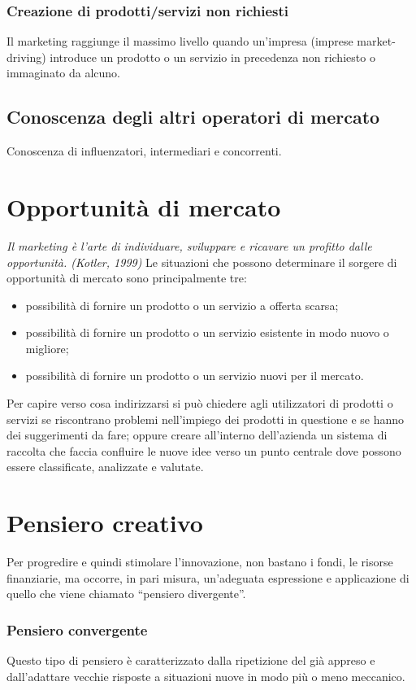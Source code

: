 \subsubsection*{Creazione di prodotti/servizi non richiesti}
Il marketing raggiunge il massimo livello quando un’impresa (imprese market-driving) introduce un prodotto o un servizio in precedenza non richiesto o immaginato da alcuno.

\subsection{Conoscenza degli altri operatori di mercato}
Conoscenza di influenzatori, intermediari e concorrenti.

\section{Opportunità di mercato}
\textit{Il marketing è l’arte di individuare, sviluppare e ricavare un profitto dalle opportunità. (Kotler, 1999) } \newline
Le situazioni che possono determinare il sorgere di opportunità di mercato sono principalmente tre:
\begin{itemize} 
	\item possibilità di fornire un prodotto o un servizio a offerta scarsa;
	\item possibilità di fornire un prodotto o un servizio esistente in modo nuovo o migliore;
	\item possibilità di fornire un prodotto o un servizio nuovi per il mercato.
\end{itemize}

Per capire verso cosa indirizzarsi si può chiedere agli utilizzatori di prodotti o servizi se riscontrano problemi nell’impiego dei prodotti in questione e se hanno dei suggerimenti da fare; oppure creare all’interno dell’azienda un sistema di raccolta che faccia confluire le nuove idee verso un punto centrale dove possono essere classificate, analizzate e valutate.

\section{Pensiero creativo}
Per progredire e quindi stimolare l’innovazione, non bastano i fondi, le risorse finanziarie, ma occorre, in pari misura, un’adeguata espressione e applicazione di quello che viene chiamato “pensiero divergente”.

\subsubsection*{Pensiero convergente}
Questo tipo di pensiero è caratterizzato dalla ripetizione del già appreso e dall’adattare vecchie risposte a situazioni nuove in modo più o meno meccanico.

